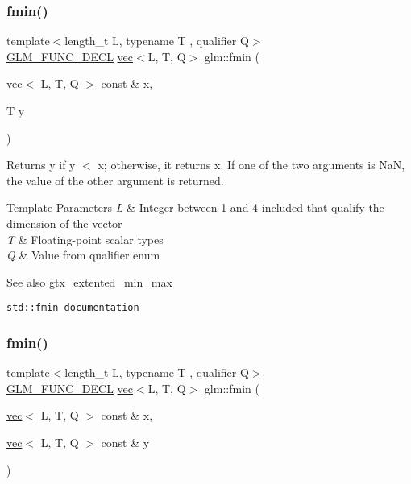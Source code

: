 \subsubsection{\texorpdfstring{fmin()}{fmin()}\hspace{0.1cm}{\footnotesize\ttfamily [2/3]}}
{\footnotesize\ttfamily template$<$length\+\_\+t L, typename T , qualifier Q$>$ \\
\hyperlink{setup_8hpp_ab2d052de21a70539923e9bcbf6e83a51}{G\+L\+M\+\_\+\+F\+U\+N\+C\+\_\+\+D\+E\+CL} \hyperlink{structglm_1_1vec}{vec}$<$L, T, Q$>$ glm\+::fmin (\begin{DoxyParamCaption}\item[{\hyperlink{structglm_1_1vec}{vec}$<$ L, T, Q $>$ const \&}]{x,  }\item[{T}]{y }\end{DoxyParamCaption})}

Returns y if y $<$ x; otherwise, it returns x. If one of the two arguments is NaN, the value of the other argument is returned.


\begin{DoxyTemplParams}{Template Parameters}
{\em L} & Integer between 1 and 4 included that qualify the dimension of the vector \\
\hline
{\em T} & Floating-\/point scalar types \\
\hline
{\em Q} & Value from qualifier enum\\
\hline
\end{DoxyTemplParams}
\begin{DoxySeeAlso}{See also}
gtx\+\_\+extented\+\_\+min\+\_\+max 

\href{http://en.cppreference.com/w/cpp/numeric/math/fmin}{\tt std\+::fmin documentation} 
\end{DoxySeeAlso}
\mbox{\label{group__gtx__extended__min__max_ga7c42e93cd778c9181d1cdeea4d3e43bd}} 
\subsubsection{\texorpdfstring{fmin()}{fmin()}\hspace{0.1cm}{\footnotesize\ttfamily [3/3]}}
{\footnotesize\ttfamily template$<$length\+\_\+t L, typename T , qualifier Q$>$ \\
\hyperlink{setup_8hpp_ab2d052de21a70539923e9bcbf6e83a51}{G\+L\+M\+\_\+\+F\+U\+N\+C\+\_\+\+D\+E\+CL} \hyperlink{structglm_1_1vec}{vec}$<$L, T, Q$>$ glm\+::fmin (\begin{DoxyParamCaption}\item[{\hyperlink{structglm_1_1vec}{vec}$<$ L, T, Q $>$ const \&}]{x,  }\item[{\hyperlink{structglm_1_1vec}{vec}$<$ L, T, Q $>$ const \&}]{y }\end{DoxyParamCaption})}

